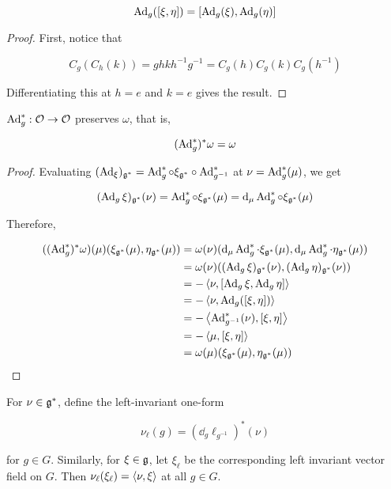 \documentclass{article}
\begin{document}
\begin{lemma}
    \[\operatorname{Ad}_g([\xi, \eta]) = [\operatorname{Ad}_g(\xi), \operatorname{Ad}_g(\eta)]\]
\end{lemma}

\begin{proof}
    First, notice that

    \[C_g(C_h(k)) = ghkh^{-1}g^{-1}= C_g(h)C_g(k)C_g(h^{-1})\]

    Differentiating this at \(h = e\) and \(k = e\) gives the result.
\end{proof}

\begin{lemma}
    \(\operatorname{Ad}_g^* : \mathcal{O} \to \mathcal{O}\) preserves \(\omega\), that is,

    \[(\operatorname{Ad}_g^*)^*\omega = \omega\]
\end{lemma}

\begin{proof}
    Evaluating \((\operatorname{Ad}_\xi)_{\mathfrak{g}^*} = \operatorname{Ad}_g^* \circ \xi_{\mathfrak{g}^*} \circ \operatorname{Ad}_{g^{-1}}^*\) at \(\nu = \operatorname{Ad}_g^*(\mu)\), we get

    \[(\operatorname{Ad}_g\xi)_{\mathfrak{g}^*}(\nu) = \operatorname{Ad}_g^* \circ \xi_{\mathfrak{g}^*}(\mu) = \dd_\mu\operatorname{Ad}_g^* \circ \xi_{\mathfrak{g}^*}(\mu)\]

    Therefore,

    \begin{align*}
        ((\operatorname{Ad}_g^*)^*\omega)(\mu)(\xi_{\mathfrak{g}^*}(\mu), \eta_{\mathfrak{g}^*}(\mu)) &= \omega(\nu)(\dd_\mu \operatorname{Ad}_g^* \cdot \xi_{\mathfrak{g}^*}(\mu), \dd_\mu \operatorname{Ad}_g^* \cdot \eta_{\mathfrak{g}^*}(\mu)) \\
        &= \omega(\nu)((\operatorname{Ad}_g\xi)_{\mathfrak{g}^*}(\nu), (\operatorname{Ad}_g\eta)_{\mathfrak{g}^*}(\nu)) \\
        &= -\left\langle \nu, [\operatorname{Ad}_g\xi, \operatorname{Ad}_g\eta] \right\rangle \\
        &= -\left\langle \nu, \operatorname{Ad}_g([\xi, \eta]) \right\rangle \\
        &= -\left\langle \operatorname{Ad}_{g^{-1}}^*(\nu), [\xi, \eta] \right\rangle \\
        &= -\left\langle \mu, [\xi, \eta] \right\rangle \\
        &= \omega(\mu)(\xi_{\mathfrak{g}^*}(\mu), \eta_{\mathfrak{g}^*}(\mu))
    \end{align*}
\end{proof}

For \(\nu \in \mathfrak{g}^*\), define the left-invariant one-form

\[\nu_\ell(g) = (\dd_g\ell_{g^{-1}})^*(\nu)\]

for \(g \in G\). Similarly, for \(\xi \in \mathfrak{g}\), let \(\xi_\ell\) be the corresponding left invariant vector field on \(G\). Then \(\nu_\ell(\xi_\ell) = \left\langle \nu, \xi \right\rangle\) at all \(g \in G\).
\end{document}
